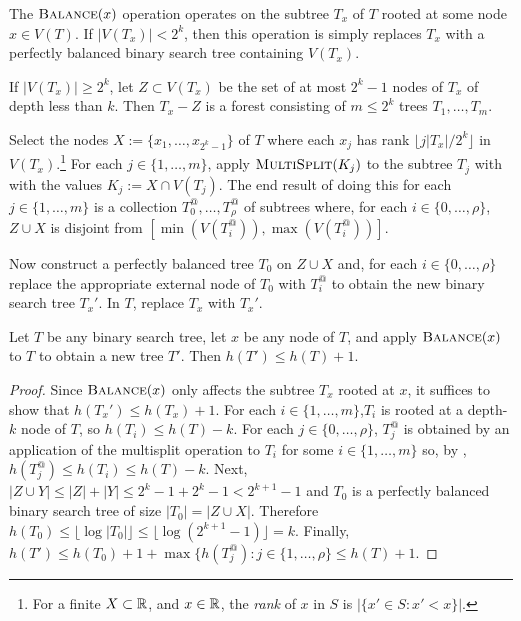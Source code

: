 \documentclass[kpfonts]{patmorin}
\begin{document}
The $\textsc{Balance}(x)$ operation operates on the subtree $T_x$ of $T$ rooted at some node $x\in V(T)$.  If $|V(T_x)|< 2^k$, then this operation is simply replaces $T_x$ with a perfectly balanced binary search tree containing $V(T_x)$.  

If $|V(T_x)|\ge 2^k$, let $Z\subset V(T_x)$ be the set of at most $2^k-1$ nodes of $T_x$ of depth less than $k$.  Then $T_x-Z$ is a forest consisting of $m\le 2^{k}$ trees $T_1,\ldots,T_m$.  

Select the nodes $X:=\{x_1,\ldots,x_{2^k-1}\}$ of $T$ where each $x_j$ has rank $\lfloor j|T_x|/2^k\rfloor$ in $V(T_x)$.\footnote{For a finite $X\subset\mathbb{R}$, and $x\in\mathbb{R}$, the \emph{rank} of $x$ in $S$ is $|\{x'\in S: x'<x\}|$.}  For each $j\in\{1,\ldots,m\}$, apply $\textsc{MultiSplit}(K_j)$ to the subtree $T_j$ with with the values $K_j:=X\cap V(T_j)$.  The end result of doing this for each $j\in\{1,\ldots,m\}$ is a collection $T^@_0,\ldots,T^@_\rho$ of subtrees where, for each $i\in\{0,\ldots,\rho\}$, $Z\cup X$ is disjoint from $[\min(V(T^@_i)), \max(V(T^@_i))]$.

Now construct a perfectly balanced tree $T_0$ on $Z\cup X$ and, for each $i\in\{0,\ldots,\rho\}$ replace the appropriate external node of $T_0$ with $T^@_i$ to obtain the new binary search tree $T_x'$.  In $T$, replace $T_x$ with $T_x'$.

\begin{lem}
  Let $T$ be any binary search tree, let $x$ be any node of $T$, and apply $\textsc{Balance}(x)$ to $T$ to obtain a new tree $T'$.  Then $h(T')\le h(T)+1$.
\end{lem}

\begin{proof}
  Since $\textsc{Balance}(x)$ only affects the subtree $T_x$ rooted at $x$, it suffices to show that $h(T_x')\le h(T_x)+1$.  For each $i\in\{1,\ldots, m\}$,$T_i$ is rooted at a depth-$k$ node of $T$, so $h(T_i)\le h(T)-k$. For each $j\in\{0,\ldots,\rho\}$, $T^@_j$ is obtained by an application of the multisplit operation to $T_i$ for some $i\in\{1,\ldots,m\}$ so, by , $h(T^@_j)\le h(T_i)\le h(T)-k$.  Next, $|Z\cup Y|\le |Z|+|Y| \le 2^k-1 + 2^k-1 < 2^{k+1}-1$ and $T_0$ is a perfectly balanced binary search tree of size $|T_0|=|Z\cup X|$.  Therefore $h(T_0)\le \lfloor\log|T_0|\rfloor\le \lfloor\log(2^{k+1}-1)\rfloor = k$.  Finally, $h(T')\le h(T_0)+1 +\max\{h(T^@_j):j\in\{1,\ldots,\rho\} \le h(T)+1$.  
\end{proof}
\end{document}
